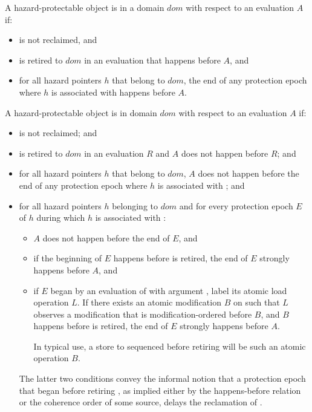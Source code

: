 \pnum
A hazard-protectable object  is  in a domain $dom$ with respect to
an evaluation $A$ if:

\begin{itemize}
\item {} is not reclaimed, and
\item {} is retired to $dom$ in an evaluation that happens before $A$, and
\item for all hazard pointers $h$ that belong to $dom$, the end of any protection epoch where $h$ is associated with  happens before $A$.
\end{itemize}

\pnum
A hazard-protectable object  is  in domain $dom$ with respect to an
evaluation $A$ if:
\begin{itemize}
\item {} is not reclaimed; and
\item {} is retired to $dom$ in an evaluation $R$ and $A$ does not happen before $R$; and
\item for all hazard pointers $h$ that belong to $dom$, $A$ does not happen before the end of
any protection epoch where $h$ is associated with ; and
\item for all hazard pointers $h$ belonging to $dom$ and for every protection epoch $E$ of $h$
during which $h$ is associated with :
\begin{itemize}
  \item $A$ does not happen before the end of $E$, and
  \item if the beginning of $E$ happens before  is retired, the end of $E$ strongly
happens before $A$, and
  \item if $E$ began by an evaluation of  with argument , label its
atomic load operation $L$. If there exists an atomic modification $B$ on  such that $L$ observes a modification that is modification-ordered before $B$, and $B$ happens before  is retired, the end of $E$ strongly happens before $A$. \begin{note} In typical use, a store to  sequenced before retiring  will be such an atomic operation $B$. \end{note}
\end{itemize}
\begin{note} The latter two conditions convey the informal notion that a protection epoch that began before retiring , as implied either by the happens-before relation or the coherence order of some source, delays the reclamation of . \end{note}
\end{itemize}


